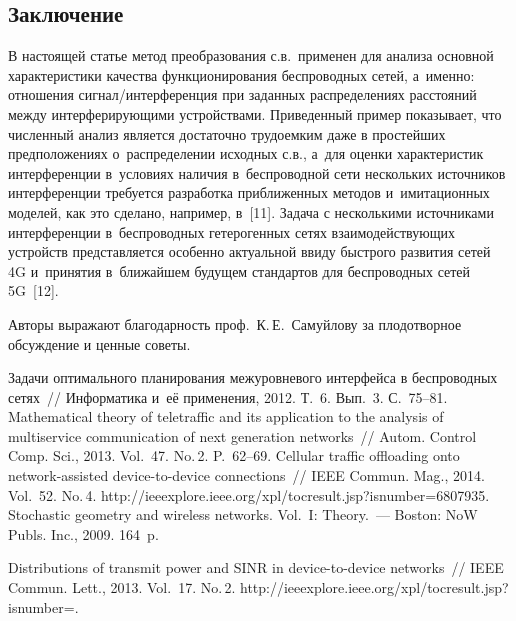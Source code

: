 \begin{multicols}{2}
\section{Заключение}

  В настоящей статье метод преобразования с.в.\ применен для
анализа основной характеристики качества функционирования беспроводных
сетей, а~именно: отношения сигнал/ин\-тер\-фе\-рен\-ция при заданных
распределениях расстояний между интерферирующими устройствами.
Приведенный пример показывает, что чис\-лен\-ный анализ является достаточно
трудоемким даже в простейших предположениях о~распределении исходных
с.в., а~для оценки характеристик интерференции в~условиях
наличия в~беспроводной сети нескольких источников интерференции требуется
разработка приближенных методов и~имитационных моделей, как это сделано,
например, в~[11]. Задача с несколькими источниками интерференции
в~беспроводных гетерогенных сетях взаимодействующих устройств
представляется особенно актуальной ввиду быст\-ро\-го развития сетей 4G
и~принятия в~ближайшем будущем стандартов для беспроводных сетей 5G~[12].
{

}

  \bigskip

Авторы выражают благодарность проф.\ К.\,Е.~Самуйлову за
плодотворное обсуждение и ценные советы.


{\small\frenchspacing
 {%
 \begin{thebibliography}{99}
 Задачи
оптимального планирования межуровневого интерфейса в беспроводных сетях~//
Информатика и~её применения, 2012. Т.~6. Вып.~3. С.~75--81.
 Mathematical theory of teletraffic and
its application to the analysis of multiservice communication of next generation networks~//
Autom. Control Comp. Sci., 2013. Vol.~47. No.\,2. P.~62--69.
 Cellular traffic
offloading onto network-assisted device-to-device connections~// IEEE Commun. Mag.,
2014. Vol.~52. No.\,4. {\sf http://ieeexplore.ieee.org/\linebreak xpl/tocresult.jsp?isnumber=6807935}.
 Stochastic geometry and wireless networks. Vol.~I: Theory.~---
Boston: NoW Publs. Inc., 2009. 164~p.


 Distributions of transmit power and SINR in
device-to-device networks~// IEEE Commun. Lett., 2013. Vol.~17. No.\,2. {\sf
http://ieeexplore.ieee.org/xpl/tocresult.jsp?isnumber=}.


\end{thebibliography}}}
\end{multicols}

